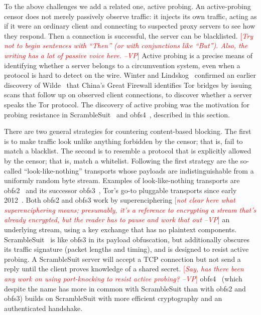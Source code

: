 \documentclass{sig-alternate}
\newcommand{\note}[1]{{\textcolor{red}{[\textit{#1}]}}}
\newcommand{\vp}[1]{\note{#1 --VP}}
\begin{document}
To the above challenges we add a related one, active probing.
An active-probing censor does not merely passively observe traffic:
it injects its own traffic,
acting as if it were an ordinary client and connecting to suspected
proxy servers to see how they respond.
Then a connection is successful, the server can be blacklisted.
\vp{Try not to begin sentences with ``Then'' (or with conjunctions like
``But'').  Also, the writing has a lot of passive voice here.}
Active probing is a precise means of identifying whether a server belongs to a circumvention system,
even when a protocol is hard to detect on the wire.
Winter and Lindskog~\cite{foci12-winter} confirmed an earlier discovery of
Wilde~\cite{wilde} that China's Great Firewall identifies Tor bridges
by issuing scans that follow up on observed client connections, to discover
whether a server speaks the Tor protocol.
The discovery of active probing was the motivation for probing resistance in ScrambleSuit~\cite{scramblesuit}
and obfs4~\cite{obfs4},
described in this section.


There are two general strategies for countering content-based blocking.
The first is to make traffic look unlike
anything forbidden by the censor; that is, fail to match a blacklist. The second is
to resemble a protocol that is explicitly allowed by the censor; that is, match a whitelist.
Following the first strategy are the so-called ``look-like-nothing'' transports whose
payloads are indistinguishable from a uniformly random byte stream.
Examples of look-like-nothing transports are
obfs2~\cite{obfs2} and its successor obfs3~\cite{obfs3},
Tor's go-to pluggable transports since early 2012~\cite{obfsproxy-arms-race}.
Both obfs2 and obfs3 work by superenciphering
\vp{not clear here what superenciphering means; presumably, it's a reference
to encrypting a stream that's already encrypted, but the reader has to pause
and work that out}
an underlying stream,
using a key exchange that has no plaintext components.
ScrambleSuit~\cite{scramblesuit} is like obfs3 in its
payload obfuscation, but additionally obscures its traffic signature
(packet lengths and timing), and is designed to resist active probing.
A ScrambleSuit server will accept a TCP connection but not send a reply
until the client proves knowledge of a shared secret.
\vp{Say, has there been any work on using port-knocking to resist active
probing?}
obfs4~\cite{obfs4}
(which despite the name has more in common with ScrambleSuit than with obfs2 and obfs3)
builds on ScrambleSuit with more efficient cryptography and an authenticated handshake.
\end{document}
